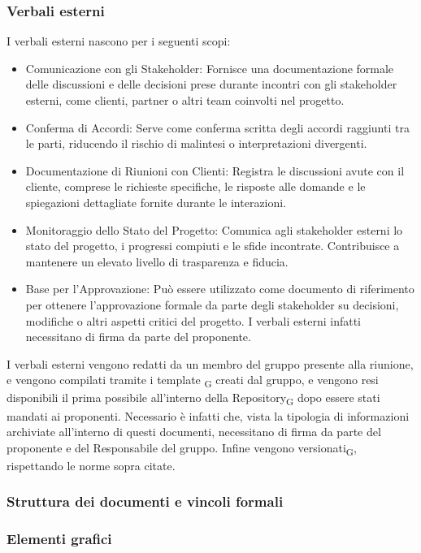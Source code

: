 \documentclass{article}
\begin{document}
\subsubsection{Verbali esterni}
I verbali esterni nascono per i seguenti scopi:
\begin{itemize}
    \item Comunicazione con gli Stakeholder: Fornisce una documentazione formale delle discussioni e delle decisioni prese durante incontri con gli stakeholder esterni, come clienti, partner o altri team coinvolti nel progetto.
    \item Conferma di Accordi: Serve come conferma scritta degli accordi raggiunti tra le parti, riducendo il rischio di malintesi o interpretazioni divergenti.
    \item Documentazione di Riunioni con Clienti: Registra le discussioni avute con il cliente, comprese le richieste specifiche, le risposte alle domande e le spiegazioni dettagliate fornite durante le interazioni.
    \item Monitoraggio dello Stato del Progetto: Comunica agli stakeholder esterni lo stato del progetto, i progressi compiuti e le sfide incontrate. Contribuisce a mantenere un elevato livello di trasparenza e fiducia.
    \item Base per l'Approvazione: Può essere utilizzato come documento di riferimento per ottenere l'approvazione formale da parte degli stakeholder su decisioni, modifiche o altri aspetti critici del progetto. I verbali esterni infatti necessitano di firma da parte del proponente.
\end{itemize}

I verbali esterni vengono redatti da un membro del gruppo presente alla riunione, e vengono compilati tramite i template \textsubscript{G} creati dal gruppo, e vengono resi disponibili il prima possibile all'interno della Repository\textsubscript{G} dopo essere stati mandati ai proponenti. Necessario è infatti che, vista la tipologia di informazioni archiviate all'interno di questi documenti, necessitano di firma da parte del proponente e del Responsabile del gruppo. Infine vengono versionati\textsubscript{G}, rispettando le norme sopra citate.

\subsubsection{Struttura dei documenti e vincoli formali}
\subsubsection{Elementi grafici}
\end{document}
